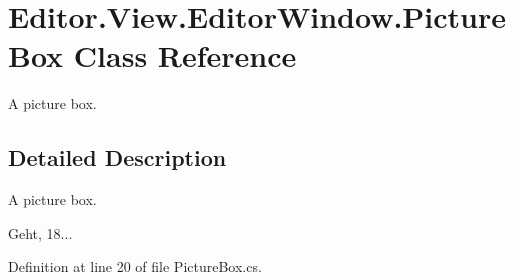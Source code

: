 \section{Editor.\-View.\-Editor\-Window.\-Picture\-Box Class Reference}
\label{class_editor_1_1_view_1_1_editor_window_1_1_picture_box}


A picture box.  




\subsection{Detailed Description}
A picture box. 

Geht, 18... 

Definition at line 20 of file Picture\-Box.\-cs.

